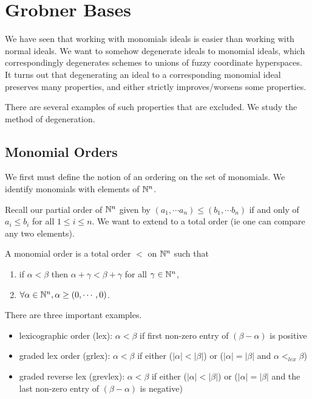 \newpage
\section{Grobner Bases}

We have seen that working with monomials ideals is easier than working with normal ideals. We want to somehow degenerate ideals to monomial ideals, which correspondingly degenerates schemes to unions of fuzzy coordinate hyperspaces. It turns out that degenerating an ideal to a corresponding monomial ideal preserves many properties, and either strictly improves/worsens some properties.

There are several examples of such properties that are excluded. We study the method of degeneration.

\subsection{Monomial Orders}

We first must define the notion of an ordering on the set of monomials. We identify monomials with elements of $\mathbb{N}^n$.

Recall our partial order of $\mathbb{N}^n$ given by $(a_1 , \cdots a_n) \leq (b_1 , \cdots b_n)$ if and only of $a_i \leq b_i $ for all $1 \leq i \leq n$.  We want to extend to a total order (ie one can compare any two elements).

\begin{definition}
A monomial order is a total order $<$ on $\mathbb{N}^n$ such that
\begin{enumerate}
    \item if $\alpha < \beta$ then $\alpha +\gamma < \beta + \gamma$ for all $\gamma \in \mathbb{N}^n$,
    \item $\forall \alpha \in \mathbb{N}^n, \alpha \geq (0,\cdots,0)$.
\end{enumerate}
\end{definition}

\begin{example}
There are three important examples.
\begin{itemize}
    \item lexicographic order (lex): $\alpha < \beta$ if first non-zero entry of $(\beta - \alpha)$ is positive
    \item graded lex order (grlex): $\alpha < \beta$ if either ($|\alpha| < |\beta|$) or ($|\alpha | = |\beta|$ and $\alpha <_{lex} \beta$)
    \item graded reverse lex (grevlex): $\alpha < \beta$ if either ($|\alpha| < |\beta|$) or ($|\alpha | = |\beta|$ and the last non-zero entry of $(\beta - \alpha)$ is negative)
\end{itemize}
\end{example}

